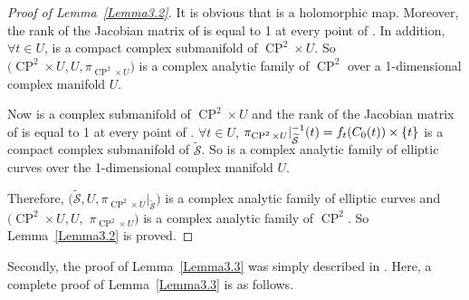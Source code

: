 \documentclass[pdftex]{sigma}
\numberwithin{equation}{section}
\begin{document}
\begin{proof}[Proof of Lemma~\ref{Lemma3.2}]
It is obvious that  is a holomorphic map. Moreover, the rank of the Jacobian matrix of  is equal to 1 at every point of . In addition, $\forall t \in U$,  is a compact complex submanifold of $\operatorname{CP}^2\times U$. So $\bigl(\operatorname{CP}^2\times U, U,\pi_{\operatorname{CP}^2\times U}\bigr)$ is a complex analytic family of $\operatorname{CP}^2$ over a 1-dimensional complex manifold $U$.

Now  is a complex submanifold of $\operatorname{CP}^2 \times U$ and the rank of the Jacobian matrix of  is equal to 1 at every point of . $\forall t \in U$, $\smash{\pi_{\operatorname{CP}^2 \times U}|_{\widetilde{\mathcal{S}}}^{-1}(t)}=f_{t}(C_0(t))\times \{ t \}$ is a compact complex submanifold of $\widetilde{\mathcal{S}}$. So  is a complex analytic family of elliptic curves over the 1-dimensional complex manifold $U$.

Therefore, $\bigl(\widetilde{\mathcal{S}},U,\pi_{\operatorname{CP}^2 \times U}|_{\widetilde{\mathcal{S}}}\bigr)$ is a complex analytic family of elliptic curves and $\bigl(\operatorname{CP}^2\times U, U,$ $\pi_{\operatorname{CP}^2\times U}\bigr)$ is a complex analytic family of $\operatorname{CP}^2$. So Lemma~\ref{Lemma3.2} is proved. \end{proof}

Secondly, the proof of Lemma~\ref{Lemma3.3} was simply described in \cite{Takayuki-Takato1}. Here, a complete proof of Lemma~\ref{Lemma3.3} is as follows.
\end{document}
